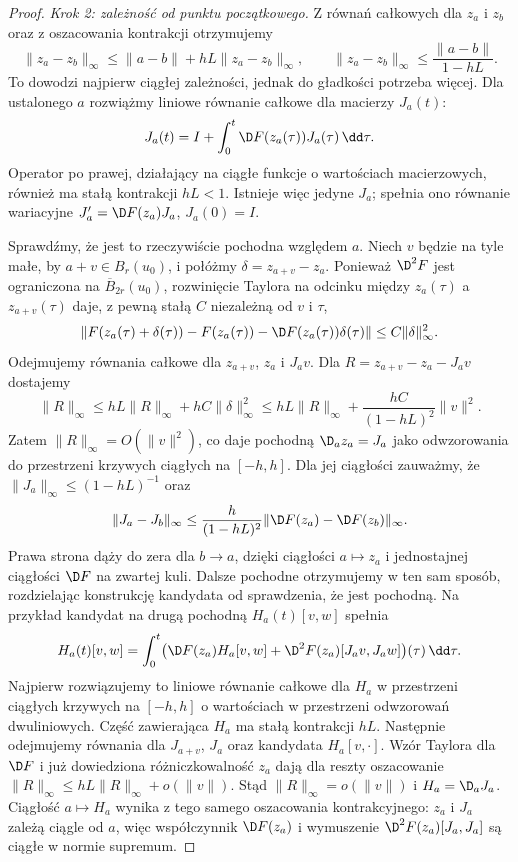 \begin{proof}
\emph{Krok 2: zależność od punktu początkowego.}
Z równań całkowych dla $z_a$ i $z_b$ oraz z oszacowania
kontrakcji otrzymujemy
\[
 \|z_a-z_b\|_\infty
 \leq \|a-b\|+hL\|z_a-z_b\|_\infty,
 \qquad
 \|z_a-z_b\|_\infty\leq\frac{\|a-b\|}{1-hL}.
\]
To dowodzi najpierw ciągłej zależności, jednak do gładkości
potrzeba więcej. Dla ustalonego $a$ rozwiążmy liniowe
równanie całkowe dla macierzy $J_a(t)$:
\[
 J_a(t)=I+\int_0^t\D F(z_a(\tau))J_a(\tau)\,\dd\tau.
\]
Operator po prawej, działający na ciągłe funkcje o wartościach
macierzowych, również ma stałą kontrakcji $hL<1$.
Istnieje więc jedyne $J_a$; spełnia ono równanie
wariacyjne $J_a'=\D F(z_a)J_a$, $J_a(0)=I$.

Sprawdźmy, że jest to rzeczywiście pochodna względem $a$.
Niech $v$ będzie na tyle małe, by $a+v\in B_r(u_0)$,
i połóżmy $\delta=z_{a+v}-z_a$.
Ponieważ $\D^2F$ jest ograniczona na $\overline B_{2r}(u_0)$,
rozwinięcie Taylora na odcinku między $z_a(\tau)$
a $z_{a+v}(\tau)$ daje, z pewną stałą $C$ niezależną
od $v$ i $\tau$,
\[
 \|F(z_a(\tau)+\delta(\tau))-F(z_a(\tau))
       -\D F(z_a(\tau))\delta(\tau)\|
 \leq C\|\delta\|_\infty^2.
\]
Odejmujemy równania całkowe dla $z_{a+v}$, $z_a$
i $J_av$. Dla $R=z_{a+v}-z_a-J_av$ dostajemy
\[
 \|R\|_\infty
 \leq hL\|R\|_\infty+hC\|\delta\|_\infty^2
 \leq hL\|R\|_\infty+
       \frac{hC}{(1-hL)^2}\|v\|^2.
\]
Zatem $\|R\|_\infty=O(\|v\|^2)$, co daje pochodną
$\D_a z_a=J_a$ jako odwzorowania do przestrzeni krzywych
ciągłych na $[-h,h]$. Dla jej ciągłości zauważmy,
że $\|J_a\|_\infty\leq(1-hL)^{-1}$ oraz
\[
 \|J_a-J_b\|_\infty
 \leq\frac{h}{(1-hL)^2}
 \|\D F(z_a)-\D F(z_b)\|_\infty.
\]
Prawa strona dąży do zera dla $b\to a$, dzięki ciągłości
$a\mapsto z_a$ i jednostajnej ciągłości $\D F$ na zwartej kuli.
Dalsze pochodne otrzymujemy w ten sam sposób, rozdzielając
konstrukcję kandydata od sprawdzenia, że jest pochodną.
Na przykład kandydat na drugą pochodną
$H_a(t)[v,w]$ spełnia
\[
 H_a(t)[v,w]=\int_0^t\bigl(
 \D F(z_a)H_a[v,w]
 +\D^2F(z_a)[J_av,J_aw]\bigr)(\tau)\,\dd\tau.
\]
Najpierw rozwiązujemy to liniowe równanie całkowe dla $H_a$
w przestrzeni ciągłych krzywych na $[-h,h]$ o wartościach
w przestrzeni odwzorowań dwuliniowych.
Część zawierająca $H_a$ ma stałą kontrakcji $hL$.
Następnie odejmujemy równania dla $J_{a+v}$, $J_a$ oraz
kandydata $H_a[v,\cdot]$. Wzór Taylora dla $\D F$ i
już dowiedziona różniczkowalność $z_a$ dają dla reszty
oszacowanie $\|R\|_\infty\leq hL\|R\|_\infty+o(\|v\|)$.
Stąd $\|R\|_\infty=o(\|v\|)$ i $H_a=\D_aJ_a$.
Ciągłość $a\mapsto H_a$ wynika z tego samego oszacowania
kontrakcyjnego: $z_a$ i $J_a$ zależą ciągle od $a$,
więc współczynnik $\D F(z_a)$ i wymuszenie
$\D^2F(z_a)[J_a,J_a]$ są ciągłe w normie supremum.


\end{proof}
